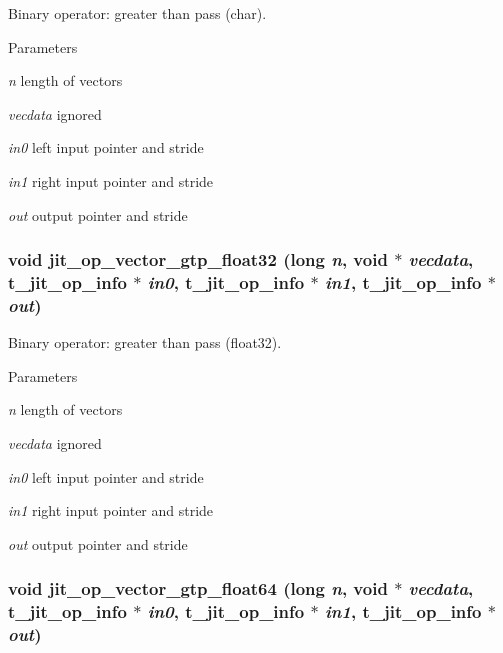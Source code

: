 Binary operator: greater than pass (char). 
\begin{DoxyParams}{Parameters}
\item[{\em n}]length of vectors \item[{\em vecdata}]ignored \item[{\em in0}]left input pointer and stride \item[{\em in1}]right input pointer and stride \item[{\em out}]output pointer and stride \end{DoxyParams}
\hypertarget{group__opvecmod_gaf9f033b45b8029a7bc804eb164007d2d}{
\subsubsection[{jit\_\-op\_\-vector\_\-gtp\_\-float32}]{\setlength{\rightskip}{0pt plus 5cm}void jit\_\-op\_\-vector\_\-gtp\_\-float32 (long {\em n}, \/  void $\ast$ {\em vecdata}, \/  {\bf t\_\-jit\_\-op\_\-info} $\ast$ {\em in0}, \/  {\bf t\_\-jit\_\-op\_\-info} $\ast$ {\em in1}, \/  {\bf t\_\-jit\_\-op\_\-info} $\ast$ {\em out})}}
\label{group__opvecmod_gaf9f033b45b8029a7bc804eb164007d2d}


Binary operator: greater than pass (float32). 
\begin{DoxyParams}{Parameters}
\item[{\em n}]length of vectors \item[{\em vecdata}]ignored \item[{\em in0}]left input pointer and stride \item[{\em in1}]right input pointer and stride \item[{\em out}]output pointer and stride \end{DoxyParams}
\hypertarget{group__opvecmod_gaed256cbf4fea6f3cab14d0cf849e4f79}{
\subsubsection[{jit\_\-op\_\-vector\_\-gtp\_\-float64}]{\setlength{\rightskip}{0pt plus 5cm}void jit\_\-op\_\-vector\_\-gtp\_\-float64 (long {\em n}, \/  void $\ast$ {\em vecdata}, \/  {\bf t\_\-jit\_\-op\_\-info} $\ast$ {\em in0}, \/  {\bf t\_\-jit\_\-op\_\-info} $\ast$ {\em in1}, \/  {\bf t\_\-jit\_\-op\_\-info} $\ast$ {\em out})}}
\label{group__opvecmod_gaed256cbf4fea6f3cab14d0cf849e4f79}


